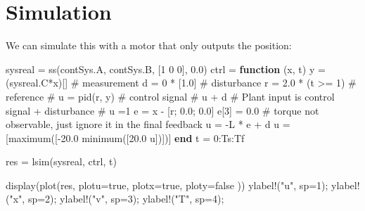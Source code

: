 \documentclass[
  8pt,
  a4paper,
]{book}
\newenvironment{Shaded}{\begin{snugshade}}{\end{snugshade}}
\newcommand{\CommentTok}[1]{\textcolor[rgb]{0.37,0.37,0.37}{#1}}
\newcommand{\ConstantTok}[1]{\textcolor[rgb]{0.56,0.35,0.01}{#1}}
\newcommand{\FloatTok}[1]{\textcolor[rgb]{0.68,0.00,0.00}{#1}}
\newcommand{\FunctionTok}[1]{\textcolor[rgb]{0.28,0.35,0.67}{#1}}
\newcommand{\KeywordTok}[1]{\textcolor[rgb]{0.00,0.23,0.31}{\textbf{#1}}}
\newcommand{\NormalTok}[1]{\textcolor[rgb]{0.00,0.23,0.31}{#1}}
\newcommand{\OperatorTok}[1]{\textcolor[rgb]{0.37,0.37,0.37}{#1}}
\newcommand{\StringTok}[1]{\textcolor[rgb]{0.13,0.47,0.30}{#1}}
\begin{document}
\section{Simulation}\label{simulation-2}

We can simulate this with a motor that only outputs the position:

\begin{Shaded}
\begin{Highlighting}[]
\NormalTok{sysreal }\OperatorTok{=} \FunctionTok{ss}\NormalTok{(contSys.A, contSys.B, [}\FloatTok{1} \FloatTok{0} \FloatTok{0}\NormalTok{], }\FloatTok{0.0}\NormalTok{)}
\NormalTok{ctrl }\OperatorTok{=} \KeywordTok{function}\NormalTok{ (x, t)}
\NormalTok{    y }\OperatorTok{=}\NormalTok{ (sysreal.C}\OperatorTok{*}\NormalTok{x)[] }\CommentTok{\# measurement}
\NormalTok{    d }\OperatorTok{=} \FloatTok{0} \OperatorTok{*}\NormalTok{ [}\FloatTok{1.0}\NormalTok{]        }\CommentTok{\# disturbance}
\NormalTok{    r }\OperatorTok{=} \FloatTok{2.0} \OperatorTok{*}\NormalTok{ (t }\OperatorTok{\textgreater{}=} \FloatTok{1}\NormalTok{) }\CommentTok{\# reference}
    \CommentTok{\# u = pid(r, y) \# control signal}
    \CommentTok{\# u + d \# Plant input is control signal + disturbance}
    \CommentTok{\# u =1}
    \ConstantTok{e} \OperatorTok{=}\NormalTok{ x }\OperatorTok{{-}}\NormalTok{ [r; }\FloatTok{0.0}\NormalTok{; }\FloatTok{0.0}\NormalTok{]}
    \ConstantTok{e}\NormalTok{[}\FloatTok{3}\NormalTok{] }\OperatorTok{=} \FloatTok{0.0} \CommentTok{\# torque not observable, just ignore it in the final feedback}
\NormalTok{    u }\OperatorTok{=} \OperatorTok{{-}}\NormalTok{L }\OperatorTok{*} \ConstantTok{e} \OperatorTok{+}\NormalTok{ d}
\NormalTok{    u }\OperatorTok{=}\NormalTok{ [}\FunctionTok{maximum}\NormalTok{([}\OperatorTok{{-}}\FloatTok{20.0} \FunctionTok{minimum}\NormalTok{([}\FloatTok{20.0}\NormalTok{ u])])]}
\KeywordTok{end}
\NormalTok{t }\OperatorTok{=} \FloatTok{0}\OperatorTok{:}\NormalTok{Ts}\OperatorTok{:}\NormalTok{Tf}

\NormalTok{res }\OperatorTok{=} \FunctionTok{lsim}\NormalTok{(sysreal, ctrl, t)}

\FunctionTok{display}\NormalTok{(}\FunctionTok{plot}\NormalTok{(res, }
\NormalTok{    plotu}\OperatorTok{=}\ConstantTok{true}\NormalTok{, }
\NormalTok{    plotx}\OperatorTok{=}\ConstantTok{true}\NormalTok{, }
\NormalTok{    ploty}\OperatorTok{=}\ConstantTok{false}
\NormalTok{    ))}
\FunctionTok{ylabel!}\NormalTok{(}\StringTok{"u"}\NormalTok{, sp}\OperatorTok{=}\FloatTok{1}\NormalTok{);}
\FunctionTok{ylabel!}\NormalTok{(}\StringTok{"x"}\NormalTok{, sp}\OperatorTok{=}\FloatTok{2}\NormalTok{);}
\FunctionTok{ylabel!}\NormalTok{(}\StringTok{"v"}\NormalTok{, sp}\OperatorTok{=}\FloatTok{3}\NormalTok{);}
\FunctionTok{ylabel!}\NormalTok{(}\StringTok{"T"}\NormalTok{, sp}\OperatorTok{=}\FloatTok{4}\NormalTok{);}
\end{Highlighting}
\end{Shaded}
\end{document}
